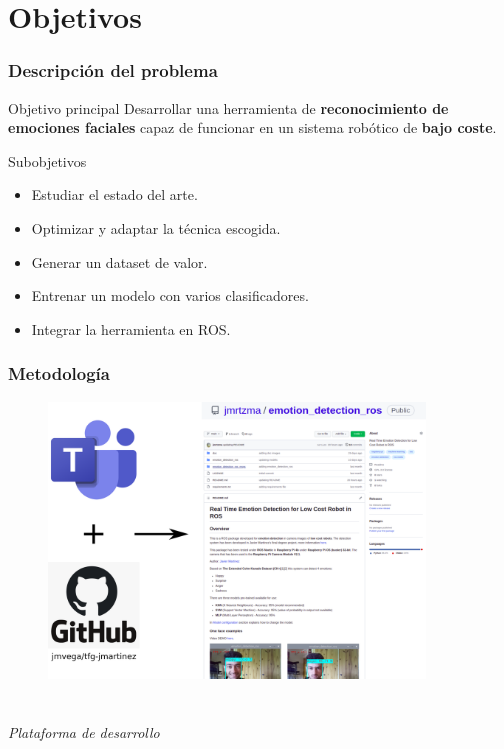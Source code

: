 \documentclass{beamer}
\begin{document}
\section{Objetivos}
\begin{frame}
\frametitle{Descripción del problema}
\begin{block}{Objetivo principal}
Desarrollar una herramienta de \textbf{reconocimiento de emociones faciales} capaz de funcionar en un sistema robótico de \textbf{bajo coste}.
\end{block}
\begin{block}{Subobjetivos}
\begin{itemize}
\item Estudiar el estado del arte.
\item Optimizar y adaptar la técnica escogida.
\item Generar un dataset de valor.
\item Entrenar un modelo con varios clasificadores.
\item Integrar la herramienta en ROS.
\end{itemize}
\end{block}
\end{frame}

\begin{frame}
\frametitle{Metodología}
\begin{figure}
    \centering
    \includegraphics[width=10cm]{figs/metodologia.png}
\end{figure}
\end{frame}

\section*{}
\begin{frame}{}
  \centering \Huge
  \emph{Plataforma de desarrollo}
\end{frame}
\end{document}

